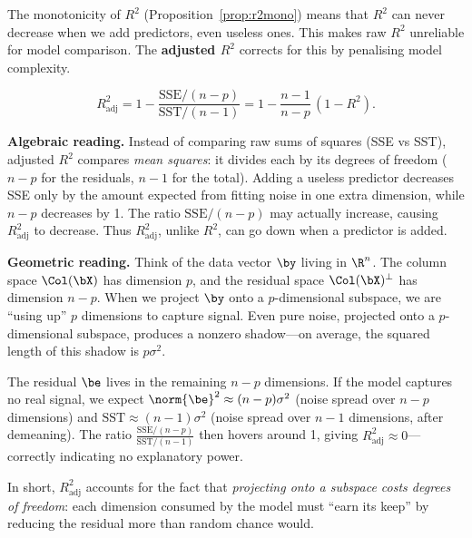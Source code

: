 The monotonicity of $R^2$ (Proposition~\ref{prop:r2mono}) means that
$R^2$ can never decrease when we add predictors, even useless ones.
This makes raw $R^2$ unreliable for model comparison.
The \textbf{adjusted $R^2$} corrects for this by penalising model complexity.

\begin{definition}[Adjusted $R^2$]
\[
  R^2_{\text{adj}}
  = 1 - \frac{\text{SSE}/(n-p)}{\text{SST}/(n-1)}
  = 1 - \frac{n-1}{n-p}\,(1-R^2).
\]
\end{definition}

\noindent\textbf{Algebraic reading.}
Instead of comparing raw sums of squares (SSE vs SST), adjusted $R^2$
compares \emph{mean squares}: it divides each by its degrees of freedom
($n-p$ for the residuals, $n-1$ for the total).
Adding a useless predictor decreases SSE only by the amount expected from
fitting noise in one extra dimension, while $n-p$ decreases by 1.
The ratio $\text{SSE}/(n-p)$ may actually increase, causing
$R^2_{\text{adj}}$ to decrease.  Thus $R^2_{\text{adj}}$, unlike $R^2$,
can go down when a predictor is added.

\medskip
\noindent\textbf{Geometric reading.}
Think of the data vector $\by$ living in $\R^n$.
The column space $\Col(\bX)$ has dimension $p$, and the residual space
$\Col(\bX)^\perp$ has dimension $n - p$.
When we project $\by$ onto a $p$-dimensional subspace, we are ``using up''
$p$ dimensions to capture signal.  Even pure noise, projected onto a
$p$-dimensional subspace, produces a nonzero shadow---on average, the
squared length of this shadow is $p\sigma^2$.

The residual $\be$ lives in the remaining $n-p$ dimensions.
If the model captures no real signal, we expect
$\norm{\be}^2 \approx (n-p)\sigma^2$ (noise spread over $n-p$ dimensions)
and $\text{SST} \approx (n-1)\sigma^2$ (noise spread over $n-1$ dimensions,
after demeaning).
The ratio $\frac{\text{SSE}/(n-p)}{\text{SST}/(n-1)}$ then hovers around 1,
giving $R^2_{\text{adj}} \approx 0$---correctly indicating no explanatory power.

In short, $R^2_{\text{adj}}$ accounts for the fact that \emph{projecting onto
a subspace costs degrees of freedom}: each dimension consumed by the model
must ``earn its keep'' by reducing the residual more than random chance would.



